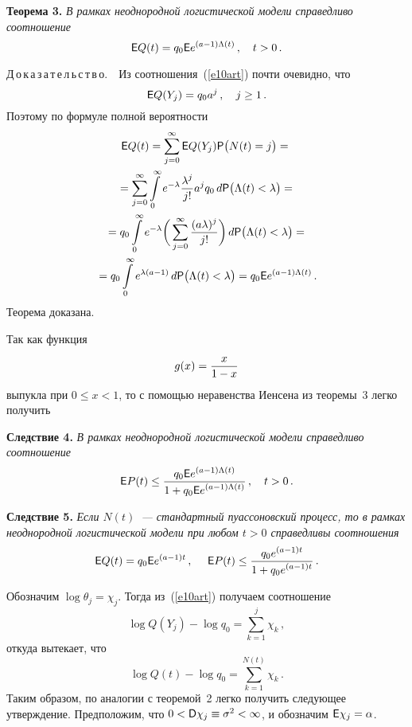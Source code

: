 \begin{multicols}{2}
\smallskip

\noindent
{\textbf{Теорема 3.}} {\it В рамках неоднородной логистической модели
справедливо соотношение}
$$
{\sf E}Q(t)=q_0{\sf E}e^{(a-1)\Lambda(t)}\,,\ \ \ t>0\,.
$$

\smallskip

\noindent
Д\,о\,к\,а\,з\,а\,т\,е\,л\,ь\,с\,т\,в\,о.\ $\,$ Из соотношения~(\ref{e10art}) почти
очевидно, что
$$
{\sf E}Q(Y_j)=q_0a^j\,,\ \ \ j\ge1\,.
$$
Поэтому по формуле полной вероятности
\begin{multline*}
{\sf E}Q(t)=\sum_{j=0}^{\infty}{\sf E}Q(Y_j){\sf
P}\big(N(t)=j\big)={}\\
{}=\sum_{j=0}^{\infty}\int\limits_{0}^{\infty}e^{-\lambda}
\displaystyle\frac{\displaystyle \lambda^j\mathstrut}{\displaystyle j!\mathstrut}a^jq_0\,d{\sf
P}\big(\Lambda(t)<\lambda\big)=
{}\\
{}
=q_0\int\limits_{0}^{\infty}e^{-\lambda}\bigg(\sum_{j=0}^{\infty}
\displaystyle\frac{\displaystyle (a\lambda)^j\mathstrut}{\displaystyle j!\mathstrut}\bigg)\,d{\sf
P}\big(\Lambda(t)<\lambda\big)={}\\
{}=q_0\int\limits_{0}^{\infty}e^{\lambda(a-1)}\,d{\sf
P}\big(\Lambda(t)<\lambda\big)=q_0{\sf E}e^{(a-1)\Lambda(t)}\,.
\end{multline*}
Теорема доказана.

\smallskip

Так как функция
$$
g(x)=\displaystyle\frac{\displaystyle x\mathstrut}{\displaystyle 1-x\mathstrut}
$$
выпукла при $0\le x<1$, то с помощью неравенства Иенсена из
теоремы~3 легко получить

\smallskip

\noindent
{\textbf{Следствие 4.}} {\it В рамках неоднородной логистической модели
справедливо соотношение}
$$
{\sf E}P(t)\le\displaystyle\frac{\displaystyle q_0{\sf E}e^{(a-1)\Lambda(t)}\mathstrut}{\displaystyle 1+q_0{\sf
E}e^{(a-1)\Lambda(t)}\mathstrut}\,,\ \ \ t>0\,.
$$

\smallskip

\noindent
{\textbf{Следствие 5.}} {\it Если $N(t)$~--- стандартный пуассоновский
процесс, то в рамках неоднородной логистической модели при любом
$t>0$ справедливы соотношения}
$$
{\sf E}Q(t)=q_0{\sf E}e^{(a-1)t}\,,\ \ \ \ {\sf
E}P(t)\le\displaystyle\frac{\displaystyle q_0e^{(a-1)t}\mathstrut}{\displaystyle 1+q_0e^{(a-1)t}\mathstrut}\,.
$$

\smallskip

Обозначим $\log \theta_j=\chi_j$. Тогда из~(\ref{e10art}) получаем
соотношение
$$
\log Q(Y_j)-\log q_0=\sum_{k=1}^{j}\chi_k\,,
$$
откуда вытекает, что
$$
\log Q(t)-\log q_0=\sum_{k=1}^{N(t)}\chi_k\,.
$$
Таким образом, по аналогии с теоремой~2 легко получить следующее
утверждение. Предположим, что $0<{\sf
D}\chi_j\equiv\sigma^2<\infty$, и обозначим ${\sf E}\chi_j=\alpha$.


\end{multicols}
